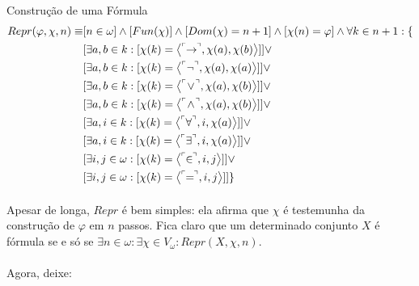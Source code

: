         \begin{definition}{Construção de uma Fórmula}
            \begin{align*}
                Repr(\varphi, \chi, n) \equiv &[n \in \omega] \land [Fun(\chi)] \land [Dom(\chi) = n+1] \land [\chi(n) = \varphi] \land \forall k\in n+1:\{\\
                    &[\exists a,b  \in k     : [\chi(k) = \TUPLE{ \FMLA{\!\!\rar\!\!} }{\chi(a)}{\chi(b)}] ] \lor \\
                    &[\exists a,b  \in k     : [\chi(k) = \TUPLE{ \FMLA{\neg}         }{\chi(a)}{\chi(a)}] ] \lor \\
                    &[\exists a,b  \in k     : [\chi(k) = \TUPLE{ \FMLA{  \!\lor\!  } }{\chi(a)}{\chi(b)}] ] \lor \\
                    &[\exists a,b  \in k     : [\chi(k) = \TUPLE{ \FMLA{  \!\land\!  }}{\chi(a)}{\chi(b)}] ] \lor \\
                    &[\exists a,i  \in k     : [\chi(k) = \TUPLE{ \FMLA{\forall}      }{   i   }{\chi(a)}] ] \lor \\
                    &[\exists a,i  \in k     : [\chi(k) = \TUPLE{ \FMLA{\exists}      }{   i   }{\chi(a)}] ] \lor \\
                    &[\exists i, j \in \omega: [\chi(k) = \TUPLE{ \FMLA{\!\!\in\!\!}  }{   i   }{   j   }] ] \lor \\
                    &[\exists i, j \in \omega: [\chi(k) = \TUPLE{ \FMLA{\!\! = \!\!}  }{   i   }{   j   }] ] \}
            \end{align*}
        \end{definition}

        \paragraph{}
            Apesar de longa, $Repr$ é bem simples: ela afirma que $\chi$ é testemunha da construção de $\varphi$ em $n$ passos. Fica claro que 
            um determinado conjunto $X$ é fórmula se e só se $\exists n\in\omega:\exists \chi \in V_\omega: Repr(X, \chi, n)$. 

        \paragraph{}
            Agora, deixe:

